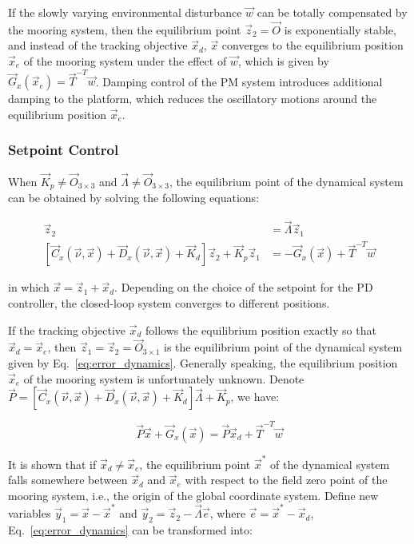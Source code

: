 \begin{sloppypar}
If the slowly varying environmental disturbance $\vec{w}$ can be totally compensated by the mooring system, then the equilibrium point $\vec{z}_2 = \vec{O}$ is exponentially stable, and instead of the tracking objective $\vec{x}_d$, $\vec{x}$ converges to the equilibrium position $\vec{x}_e$ of the mooring system under the effect of $\vec{w}$, which is given by $\vec{G}_x(\vec{x}_e) = \vec{T}^{-T}\vec{w}$. Damping control of the PM system introduces additional damping to the platform, which reduces the oscillatory motions around the equilibrium position $\vec{x}_e$.

\subsubsection{Setpoint Control}
When $\vec{K}_p \neq \vec{O}_{3\times3}$ and $\vec{\Lambda} \neq \vec{O}_{3\times3}$, the equilibrium point of the dynamical system can be obtained by solving the following equations:

\begin{align}
\vec{z}_2 &= \vec{\Lambda}\vec{z}_1 \\
\left[ \vec{C}_x(\vec{\nu}, \vec{x}) + \vec{D}_x(\vec{\nu}, \vec{x}) + \vec{K}_d \right]\vec{z}_2 + \vec{K}_p\vec{z}_1 &=  - \vec{G}_x(\vec{x}) + \vec{T}^{-T}\vec{w}
\end{align}

\noindent in which $\vec{x} = \vec{z}_1 + \vec{x}_d$. Depending on the choice of the setpoint for the PD controller, the closed-loop system converges to different positions.

If the tracking objective $\vec{x}_d$ follows the equilibrium position exactly so that $\vec{x}_d = \vec{x}_e$, then $\vec{z}_1 = \vec{z}_2 = \vec{O}_{3\times1}$ is the equilibrium point of the dynamical system given by Eq.~\ref{eq:error_dynamics}. Generally speaking, the equilibrium position $\vec{x}_e$ of the mooring system is unfortunately unknown. Denote $\vec{P} = \left[ \vec{C}_x(\vec{\nu}, \vec{x}) + \vec{D}_x(\vec{\nu}, \vec{x}) + \vec{K}_d \right] \vec{\Lambda}+ \vec{K}_p$, we have:

\begin{equation}
\vec{P}\vec{x} + \vec{G}_x(\vec{x}) = \vec{P}\vec{x}_d + \vec{T}^{-T}\vec{w} 
\end{equation}

\noindent It is shown that if $\vec{x}_d \neq \vec{x}_e$, the equilibrium point $\vec{x}^*$ of the dynamical system falls somewhere between $\vec{x}_d$ and $\vec{x}_e$ with respect to the field zero point of the mooring system, i.e., the origin of the global coordinate system. Define new variables $\vec{y}_1 = \vec{x} - \vec{x}^*$ and $\vec{y}_2 = \vec{z}_2 - \vec{\Lambda}\vec{e}$, where $\vec{e} = \vec{x}^* - \vec{x}_d$, Eq.~\ref{eq:error_dynamics} can be transformed into:


\end{sloppypar}

